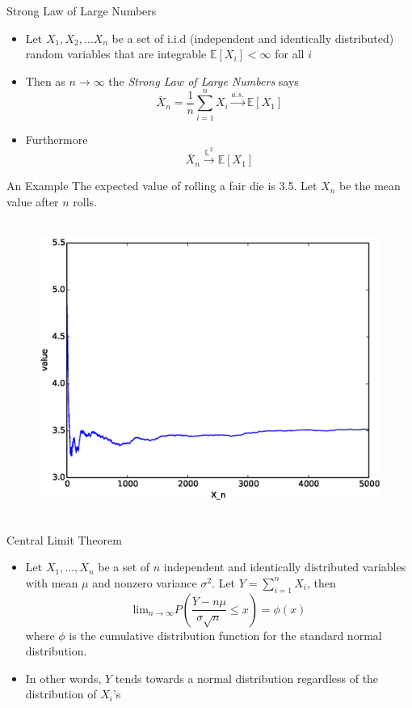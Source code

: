 \documentclass{beamer}
\begin{document}
\begin{frame}{Strong Law of Large Numbers} 
\begin{itemize}
 \item Let $X_1, X_2, \ldots X_n$ be a set of i.i.d (independent and identically distributed) random variables that are integrable $\mathbb{E}[X_i] < \infty$ for all $i$
 \item Then as $n \rightarrow \infty$ the \emph{Strong Law of Large Numbers} says
 \begin{displaymath} 
  \bar{X}_n = \frac{1}{n}\sum_{i=1}^n X_i \xrightarrow{a.s.} \mathbb{E}[X_1]
 \end{displaymath}
\item Furthermore 
\begin{displaymath} 
 \bar{X}_n \xrightarrow{\mathbb{L}^2} \mathbb{E}[X_1]
\end{displaymath}
\end{itemize}
\end{frame}

\begin{frame}{An Example}
The expected value of rolling a fair die is 3.5. Let $X_n$ be the mean value after $n$ rolls. 
\begin{figure}[htp]
\mbox{
\includegraphics[width=0.5\linewidth]{LawLargeNumbers.eps}
}
\end{figure} 
\end{frame}



\begin{frame}{Central Limit Theorem} 
\begin{itemize} 
 \item Let $X_1, \ldots, X_n$ be a set of $n$ independent and identically distributed variables with mean $\mu$ and nonzero variance $\sigma^2$. Let $Y = \sum_{i=1}^n X_i$, then 
\begin{displaymath}
 \mbox{lim}_{n \rightarrow \infty} P\left(\frac{Y - n\mu}{\sigma\sqrt{n}} \leq x\right) = \phi(x)
\end{displaymath}
where $\phi$ is the cumulative distribution function for the standard normal distribution. 
\item In other words, $Y$ tends towards a normal distribution regardless of the distribution of $X_i$'s 
\end{itemize}
\end{frame}
\end{document}
